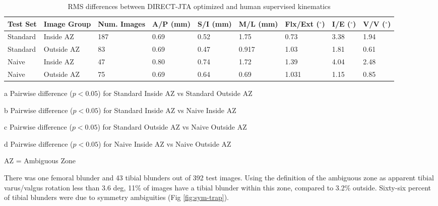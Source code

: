 \begin{table}[ht]
	\small
	\centering
	\caption{RMS differences between DIRECT-JTA optimized and human supervised kinematics}
	\label{tab:direct-rms}
	\begin{threeparttable}
		\begin{tabularx}{\linewidth}{XXXXXXXXX}
			\hline
			Test Set & Image Group & Num. Images & A/P (mm) & S/I (mm)      & M/L (mm)      & Flx/Ext ($^{\circ}$) & I/E ($^{\circ}$) & V/V ($^{\circ}$) \\ %
			\hline
			Standard & Inside AZ   & 187         & 0.69     & 0.52\tnote{b} & 1.75\tnote{a} & 0.73\tnote{a}        & 3.38             & 1.94\tnote{a}    \\ \hline
			Standard & Outside AZ  & 83          & 0.69     & 0.47\tnote{c} & 0.917         & 1.03                 & 1.81             & 0.61             \\ \hline
			Naive    & Inside AZ   & 47          & 0.80     & 0.74          & 1.72          & 1.39                 & 4.04             & 2.48\tnote{d}    \\ \hline
			Naive    & Outside AZ  & 75          & 0.69     & 0.64          & 0.69          & 1.031                & 1.15             & 0.85             \\ \hline
		\end{tabularx}
		\begin{tablenotes}
			\footnotesize
			\item[a] Pairwise difference ($p<0.05$) for Standard Inside AZ vs Standard Outside AZ %
			\item[b] Pairwise difference ($p<0.05$) for Standard Inside AZ vs Naive Inside AZ
			\item[c] Pairwise difference ($p<0.05$) for Standard Outside AZ vs Naive Outside AZ
			\item[d] Pairwise difference ($p<0.05$) for Naive Inside AZ vs Naive Outside AZ

			AZ = Ambiguous Zone
		\end{tablenotes}
	\end{threeparttable}
\end{table}



There was one femoral blunder and 43 tibial blunders out of 392 test images. Using the definition of the ambiguous zone as apparent tibial varus/valgus rotation less than 3.6 deg, 11\% of images have a tibial blunder within this zone, compared to 3.2\% outside. Sixty-six percent of tibial blunders were due to symmetry ambiguities (Fig \ref{fig:sym-trap}).


